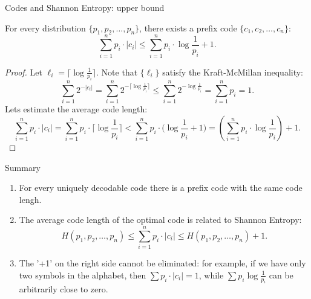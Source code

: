 \documentclass[aspectratio=169]{beamer}
\newcommand{\seqn}[2]{{#1}_1,{#1}_2,\dotsc,{#1}_{#2}}
\begin{document}
    \begin{frame}{Codes and Shannon Entropy: upper bound}
        \begin{theorem}[Shannon]\label{thm:shannon:optcode}
            For every distribution \(\{\seqn{p}{n}\}\), there exists
            a prefix code \(\{\seqn{c}{n}\}\):
            \[
            \sum_{i=1}^n p_i \cdot |c_i| \le \sum_{i=1}^n p_i \cdot \log \frac{1}{p_i} + 1.
            \]
        \end{theorem}\vspace{-5mm}
        \begin{proof}
            Let \(\ell_i = \bigl\lceil \log \frac{1}{p_i} \bigr\rceil\). Note that \(\{
            \ell_i\}\) satisfy
            the Kraft-McMillan inequality:
            \[
            \sum_{i=1}^n 2^{-|c_i|} =
            \sum_{i=1}^n 2^{-\lceil \log \frac{1}{p_i} \rceil} \le
            \sum_{i=1}^n 2^{-\log \frac{1}{p_i}} =
            \sum_{i=1}^n p_i = 1.
            \]
            Lets estimate the average code length:
            \[
            \sum_{i=1}^n p_i \cdot |c_i| =
            \sum_{i=1}^n p_i \cdot \bigl\lceil \log{\textstyle\frac{1}{p_i}} \bigr\rceil <
            \sum_{i=1}^n p_i \cdot \bigl(\log{\textstyle\frac{1}{p_i}} + 1\bigr) =
            \left(\sum_{i=1}^n p_i \cdot \log{\textstyle\frac{1}{p_i}}\right) + 1.
            \]
        \end{proof}
    \end{frame}

    \begin{frame}{Summary}
        \begin{enumerate}
            \item For every uniquely decodable code there is a prefix code with
            the same code lengh.
            \item The average code length of the optimal code is related to Shannon Entropy:
            \[
            H(\seqn{p}{n}) \le \sum_{i=1}^{n} p_i\cdot |c_i| \le H(\seqn{p}{n}) +1.
            \]
            \item
            The '+1' on the right side cannot be eliminated: for example, if we have only two symbols in
            the alphabet, then \(\sum p_i \cdot |c_i| = 1\), while \(\sum
            p_i \log \frac{1}{p_i}\) can be arbitrarily close to zero.

        \end{enumerate}
    \end{frame}
\end{document}
